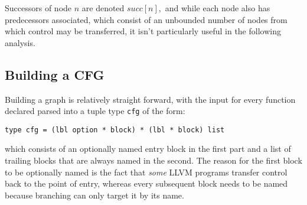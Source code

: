 \documentclass{article}
\begin{document}
Successors of node \(n\) are denoted \( \mathit{succ}[n], \)
and while each node also has predecessors associated, which consist of an  unbounded number of nodes from which control may be transferred, it isn't particularly useful in the following analysis.













\subsection{Building a CFG}




Building a graph is relatively straight forward, with the input for every function declared parsed into a tuple type \texttt{cfg}  of the form:
\begin{center}
\begin{verbatim}
type cfg = (lbl option * block) * (lbl * block) list
\end{verbatim}
\end{center}
which consists of an optionally named entry block in the first part and a list of trailing blocks that are always named in the second. The reason for the first block to be optionally named is the fact that \textit{some} LLVM programs transfer control back to the point of entry, whereas every subsequent block needs to be named because branching can only target it by its name.
\end{document}
